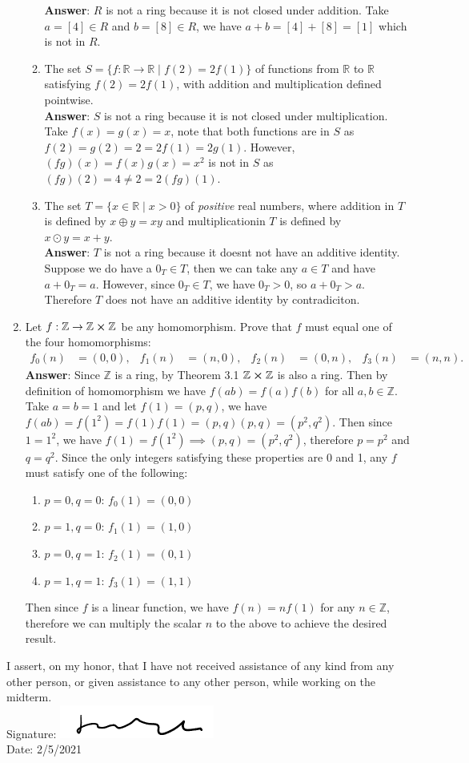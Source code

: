 \documentclass{article}
\begin{document}
\begin{enumerate}
\begin{enumerate}
                        \textbf{Answer}: $R$ is not a ring because it is not closed under addition. Take $a=[4]\in R$ and $b=[8]\in R$, we have $a+b=[4]+[8]=[1]$ which is not in $R$.
                  \item The set $S=\{f:\mathbb{R}\rightarrow\mathbb{R}\mid f(2)=2f(1)\}$ of functions from $\mathbb{R}$ to $\mathbb{R}$ satisfying $f(2)=2f(1)$, with addition and multiplication defined pointwise.\\
                        \textbf{Answer}: $S$ is not a ring because it is not closed under multiplication. Take $f(x)=g(x)=x$, note that both functions are in $S$ as $f(2)=g(2)=2=2f(1)=2g(1)$. However, $(fg)(x)=f(x)g(x)=x^2$ is not in $S$ as $(fg)(2)=4\neq 2=2(fg)(1)$.
                  \item The set $T=\{x\in\mathbb{R}\mid x>0\}$ of \textit{positive} real numbers, where addition in $T$ is defined by $x\oplus y=xy$ and multiplicationin $T$ is defined by $x\odot y=x+y$.\\
                        \textbf{Answer}: $T$ is not a ring because it doesnt not have an additive identity. Suppose we do have a $0_T\in T$, then we can take any $a\in T$ and have $a+0_T=a$. However, since $0_T\in T$, we have $0_T>0$, so $a+0_T>a$. Therefore $T$ does not have an additive identity by contradiciton.
            \end{enumerate}
            \newpage
      \item Let $f:\mathbb{Z}\rightarrow\mathbb{Z}\cross\mathbb{Z}$ be any homomorphism. Prove that $f$ must equal one of the four homomorphisms: \begin{align*}f_0(n)&= (0,0),&f_1(n)&= (n,0),&f_2(n)&= (0,n),&f_3(n)&= (n,n).\end{align*}
            \textbf{Answer}: Since $\mathbb{Z}$ is a ring, by Theorem 3.1 $\mathbb{Z}\cross\mathbb{Z}$ is also a ring. Then by definition of homomorphism we have $f(ab)=f(a)f(b)$ for all $a,b\in\mathbb{Z}$. Take $a=b=1$ and let $f(1)=(p,q)$, we have $f(ab)=f(1^2)=f(1)f(1)=(p,q)(p,q)=(p^2,q^2)$. Then since $1=1^2$, we have $f(1)=f(1^2)\implies (p,q)=(p^2,q^2)$, therefore $p=p^2$ and $q=q^2$. Since the only integers satisfying these properties are 0 and 1, any $f$ must satisfy one of the following:
            \begin{enumerate}
                  \item $p=0,q=0$: $f_0(1)=(0,0)$
                  \item $p=1,q=0$: $f_1(1)=(1,0)$
                  \item $p=0,q=1$: $f_2(1)=(0,1)$
                  \item $p=1,q=1$: $f_3(1)=(1,1)$
            \end{enumerate}
            Then since $f$ is a linear function, we have $f(n)=nf(1)$ for any $n\in\mathbb{Z}$, therefore we can multiply the scalar $n$ to the above to achieve the desired result.
            \newpage
\end{enumerate}

I assert, on my honor, that I have not received assistance of any kind from any other person, or given assistance to any other person, while working on the midterm.\\
Signature: \includegraphics[width=2in]{signature.png}\\
Date: 2/5/2021
\end{document}
